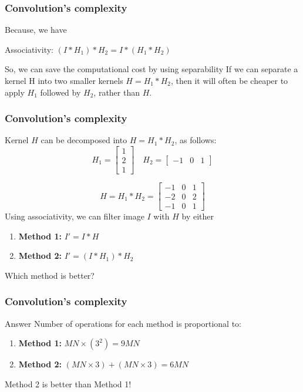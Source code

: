 \documentclass[english,11pt,table,handout]{beamer}
\begin{document}
\frame
{
	\frametitle{Convolution's complexity}
	Because, we have
	\begin{block}{Associativity:}
		\centering
		$(I * H_{1})*H_{2} =I * (H_{1}*H_{2})$
	\end{block}
	
	\begin{alertblock}{So, we can save the computational cost by using separability}
		If we can separate a kernel H into two smaller kernels $H = H_{1} * H_{2}$, then it will often be cheaper to apply $H_{1}$ followed by $H_{2}$, rather than $H$.
	\end{alertblock}
}
\frame
{
	\frametitle{Convolution's complexity}
	\begin{example}
		Kernel $H$ can be decomposed into $H = H_{1} *H_{2}$, as follows:
		$$
		H_{1} = 
		\begin{bmatrix}
			1 \\ 2 \\ 1
		\end{bmatrix}
		\quad
		H_{2} = 
		\begin{bmatrix}
			-1 & 0 & 1	
		\end{bmatrix}
		$$
		
		$$
		H  = H_{1} * H_{2} = 
		\begin{bmatrix}
			-1 & 0 & 1\\
			-2 & 0 & 2\\
			-1 & 0 & 1
		\end{bmatrix}
		$$
		Using associativity, we can filter image $I$ with $H$ by either
		\begin{enumerate}
			\item \textbf{Method 1:} $I' = I*H$
			\item \textbf{Method 2:} $I' = (I*H_{1})*H_{2}$
		\end{enumerate}
		Which method is better?
	\end{example}	
}
\frame
{
	\frametitle{Convolution's complexity}
	\begin{block}{Answer}
		Number of operations for each method is proportional to:
		\begin{enumerate}
			\item \textbf{Method 1:} $MN \times (3^2) = 9MN$
			\item \textbf{Method 2:} $(MN \times 3) + (MN \times 3) = 6MN$
		\end{enumerate}
		Method 2 is better than Method 1!
	\end{block}
}
\frame
\end{document}
